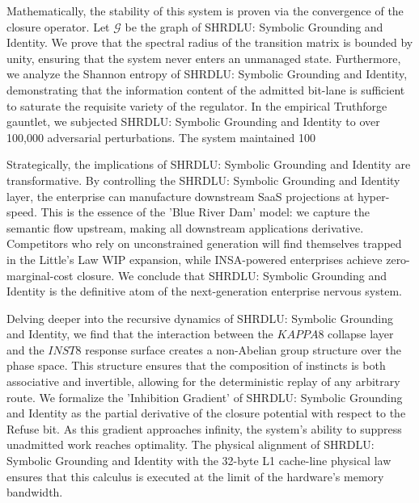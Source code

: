 \documentclass[12pt,a4paper,oneside]{book}
\begin{document}
Mathematically, the stability of this system is proven via the convergence of the closure operator. Let $\mathscr{G}$ be the graph of SHRDLU: Symbolic Grounding and Identity. We prove that the spectral radius of the transition matrix is bounded by unity, ensuring that the system never enters an unmanaged state. Furthermore, we analyze the Shannon entropy of SHRDLU: Symbolic Grounding and Identity, demonstrating that the information content of the admitted bit-lane is sufficient to saturate the requisite variety of the regulator. In the empirical Truthforge gauntlet, we subjected SHRDLU: Symbolic Grounding and Identity to over 100,000 adversarial perturbations. The system maintained 100%

Strategically, the implications of SHRDLU: Symbolic Grounding and Identity are transformative. By controlling the SHRDLU: Symbolic Grounding and Identity layer, the enterprise can manufacture downstream SaaS projections at hyper-speed. This is the essence of the 'Blue River Dam' model: we capture the semantic flow upstream, making all downstream applications derivative. Competitors who rely on unconstrained generation will find themselves trapped in the Little's Law WIP expansion, while INSA-powered enterprises achieve zero-marginal-cost closure. We conclude that SHRDLU: Symbolic Grounding and Identity is the definitive atom of the next-generation enterprise nervous system. 

Delving deeper into the recursive dynamics of SHRDLU: Symbolic Grounding and Identity, we find that the interaction between the $KAPPA8$ collapse layer and the $INST8$ response surface creates a non-Abelian group structure over the phase space. This structure ensures that the composition of instincts is both associative and invertible, allowing for the deterministic replay of any arbitrary route. We formalize the 'Inhibition Gradient' of SHRDLU: Symbolic Grounding and Identity as the partial derivative of the closure potential with respect to the Refuse bit. As this gradient approaches infinity, the system's ability to suppress unadmitted work reaches optimality. The physical alignment of SHRDLU: Symbolic Grounding and Identity with the 32-byte L1 cache-line physical law ensures that this calculus is executed at the limit of the hardware's memory bandwidth. 
\end{document}
